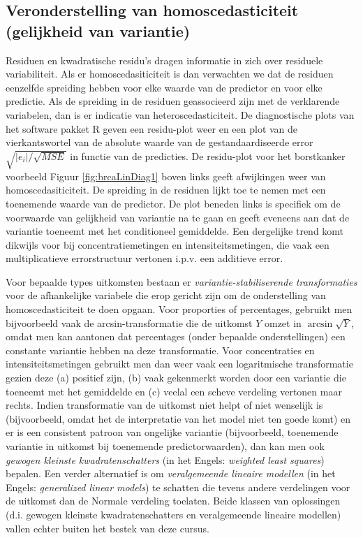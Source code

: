 \documentclass[
  12pt,dutch]{book}
\theoremstyle{definition}
\theoremstyle{definition}
\theoremstyle{definition}
\theoremstyle{definition}
\theoremstyle{remark}
\begin{document}
\subsection{Veronderstelling van homoscedasticiteit (gelijkheid van variantie)}\label{veronderstelling-van-homoscedasticiteit-gelijkheid-van-variantie}

Residuen en kwadratische residu's dragen informatie in zich over residuele variabiliteit.
Als er homoscedasiticiteit is dan verwachten we dat de residuen eenzelfde spreiding hebben voor elke waarde van de predictor en voor elke predictie.
Als de spreiding in de residuen geassocieerd zijn met de verklarende variabelen, dan is er indicatie van heteroscedasticiteit.
De diagnostische plots van het software pakket R geven een residu-plot weer en een plot van de vierkantswortel van de absolute waarde van de gestandaardiseerde error \(\sqrt{|e_i|/\sqrt{MSE}}\) in functie van de predicties.
De residu-plot voor het borstkanker voorbeeld Figuur \ref{fig:brcaLinDiag1} boven links geeft afwijkingen weer van homoscedasiticiteit.
De spreiding in de residuen lijkt toe te nemen met een toenemende waarde van de predictor.
De plot beneden links is specifiek om de voorwaarde van gelijkheid van variantie na te gaan en geeft eveneens aan dat de variantie toeneemt met het conditioneel gemiddelde.
Een dergelijke trend komt dikwijls voor bij concentratiemetingen en intensiteitsmetingen, die vaak een multiplicatieve errorstructuur vertonen i.p.v. een additieve error.

Voor bepaalde types uitkomsten bestaan er \emph{variantie-stabiliserende transformaties} voor de afhankelijke variabele die erop gericht zijn om de onderstelling van homoscedasticiteit te doen opgaan. Voor proporties of percentages, gebruikt men bijvoorbeeld vaak de arcsin-transformatie die de uitkomst \(Y\) omzet in \(\arcsin\sqrt{Y}\), omdat men kan aantonen dat percentages (onder bepaalde onderstellingen) een constante variantie hebben na deze transformatie.
Voor concentraties en intensiteitsmetingen gebruikt men dan weer vaak een logaritmische transformatie gezien deze (a) positief zijn, (b) vaak gekenmerkt worden door een variantie die toeneemt met het gemiddelde en (c) veelal een scheve verdeling vertonen maar rechts.
Indien transformatie van de uitkomst niet helpt of niet wenselijk is (bijvoorbeeld, omdat het de interpretatie van het model niet ten goede komt) en er is een consistent patroon van ongelijke variantie (bijvoorbeeld, toenemende variantie in uitkomst bij toenemende predictorwaarden), dan kan men ook \emph{gewogen kleinste kwadratenschatters} (in het Engels: \emph{weighted least squares}) bepalen. Een verder alternatief is om \emph{veralgemeende lineaire modellen} (in het Engels: \emph{generalized linear models}) te schatten die tevens andere verdelingen voor de uitkomst dan de Normale verdeling toelaten. Beide klassen van oplossingen (d.i. gewogen kleinste kwadratenschatters en veralgemeende lineaire modellen) vallen echter buiten het bestek van deze cursus.
\end{document}
